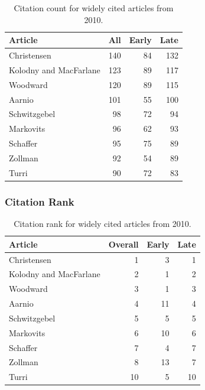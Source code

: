 \documentclass[
  10pt,
  letterpaper,
  DIV=11,
  numbers=noendperiod,
  twoside]{scrartcl}
\begin{document}
\begin{longtable}[]{@{}lrrr@{}}

\caption{\label{tbl-citation-count-2010}Citation count for widely cited
articles from 2010.}

\tabularnewline

\toprule\noalign{}
Article & All & Early & Late \\
\midrule\noalign{}
\endhead
\bottomrule\noalign{}
\endlastfoot
Christensen & 140 & 84 & 132 \\
Kolodny and MacFarlane & 123 & 89 & 117 \\
Woodward & 120 & 89 & 115 \\
Aarnio & 101 & 55 & 100 \\
Schwitzgebel & 98 & 72 & 94 \\
Markovits & 96 & 62 & 93 \\
Schaffer & 95 & 75 & 89 \\
Zollman & 92 & 54 & 89 \\
Turri & 90 & 72 & 83 \\

\end{longtable}

\subsubsection*{Citation Rank}\label{citation-rank-34}

\begin{longtable}[]{@{}lrrr@{}}

\caption{\label{tbl-citation-rank-2010}Citation rank for widely cited
articles from 2010.}

\tabularnewline

\toprule\noalign{}
Article & Overall & Early & Late \\
\midrule\noalign{}
\endhead
\bottomrule\noalign{}
\endlastfoot
Christensen & 1 & 3 & 1 \\
Kolodny and MacFarlane & 2 & 1 & 2 \\
Woodward & 3 & 1 & 3 \\
Aarnio & 4 & 11 & 4 \\
Schwitzgebel & 5 & 5 & 5 \\
Markovits & 6 & 10 & 6 \\
Schaffer & 7 & 4 & 7 \\
Zollman & 8 & 13 & 7 \\
Turri & 10 & 5 & 10 \\

\end{longtable}
\end{document}
